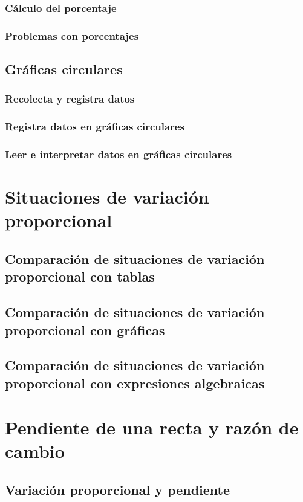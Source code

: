 \documentclass[12pt]{book}
\begin{document}
\begin{mainmatter}
    \subsubsection{Cálculo del porcentaje}
    \subsubsection{Problemas con porcentajes}
    \subsection{Gráficas circulares}
    \subsubsection{Recolecta y registra datos}
    \subsubsection{Registra datos en gráficas circulares}
    \subsubsection{Leer e interpretar datos en gráficas circulares}

    \section{Situaciones de variación proporcional}
    \subsection{Comparación de situaciones de variación proporcional con tablas}
    \subsection{Comparación de situaciones de variación proporcional con gráficas}
    \subsection{Comparación de situaciones de variación proporcional con expresiones algebraicas}

    \section{Pendiente de una recta y razón de cambio}
    \subsection{Variación proporcional y pendiente}

\end{mainmatter}
\end{document}
